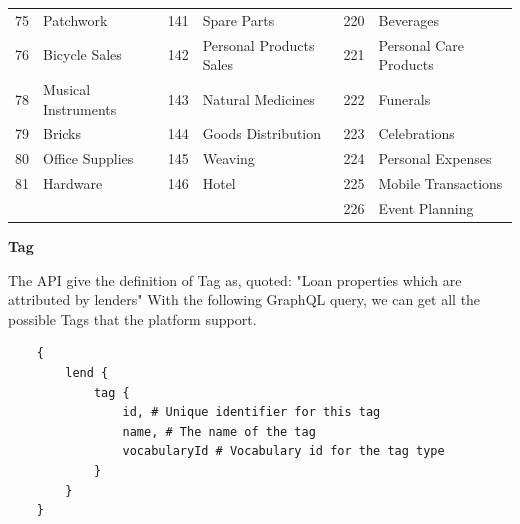 \begin{longtable}[]{|r|l|r|l|r|l|}
    75                                & Patchwork                          & 141                               & Spare Parts                        & 220                               & Beverages                          \\
    76                                & Bicycle Sales                      & 142                               & Personal Products Sales            & 221                               & Personal Care
    Products                                                                                                                                                                                                                 \\
    78                                & Musical Instruments                & 143                               & Natural Medicines                  & 222                               & Funerals                           \\
    79                                & Bricks                             & 144                               & Goods Distribution                 & 223                               & Celebrations                       \\
    80                                & Office Supplies                    & 145                               & Weaving                            & 224                               & Personal Expenses                  \\
    81                                & Hardware                           & 146                               & Hotel                              & 225                               & Mobile Transactions                \\
                                      &                                    &                                   &                                    & 226                               & Event Planning                     \\
\end{longtable}

\textbf{Tag}

The API give the definition of Tag as,
quoted: "Loan properties which are attributed by lenders"
With the following GraphQL query, we can get all the possible Tags that the platform support.

\begin{lstlisting}
    {
        lend {
            tag {
                id, # Unique identifier for this tag
                name, # The name of the tag
                vocabularyId # Vocabulary id for the tag type
            }
        }
    }
\end{lstlisting}

